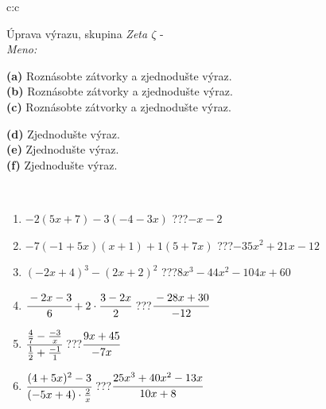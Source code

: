 \documentclass[10pt]{report}
\begin{document}
\newpage
\thispagestyle{empty}
\begin{tabular}{c:c}
\begin{minipage}[c][104.5mm][t]{0.5\linewidth}
\begin{center}
\vspace{7mm}
{\huge Úprava výrazu, skupina \textit{Zeta $\zeta$} -}\\[5mm]
\textit{Meno:}\phantom{xxxxxxxxxxxxxxxxxxxxxxxxxxxxxxxxxxxxxxxxxxxxxxxxxxxxxxxxxxxxxxxxx}\\[5mm]
\begin{minipage}{0.95\linewidth}
\begin{center}
{\small \begin{minipage}{0.6\textwidth}
\textbf{(a)} Roznásobte zátvorky a zjednodušte výraz. \\[1mm]
\textbf{(b)} Roznásobte zátvorky a zjednodušte výraz. \\[1mm]
\textbf{(c)} Roznásobte zátvorky a zjednodušte výraz.
\end{minipage} \begin{minipage}{0.39\textwidth}
\textbf{(d)} Zjednodušte výraz. \\[1mm]
\textbf{(e)} Zjednodušte výraz. \\[1mm]
\textbf{(f)} Zjednodušte výraz.
\end{minipage}
}
\end{center}
\end{minipage}
\\[4mm]
\begin{minipage}{0.79\linewidth}
\begin{center}
\begin{varwidth}{\linewidth}
\begin{enumerate}
\normalsize
\item $-2(5x+7)-3(-4-3x)$\quad \dotfill\; ???\;\dotfill \quad $-x-2$
\item $-7(-1+5x)(x+1)+1(5+7x)$\quad \dotfill\; ???\;\dotfill \quad $-35x^2+21x-12$
\item $(-2x+4)^3-(2x+2)^2$\quad \dotfill\; ???\;\dotfill \quad $8x^3-44x^2-104x+60$
\item $\cfrac{-2x-3}{6}+2\cdot\cfrac{3-2x}{2}$\quad \dotfill\; ???\;\dotfill \quad $\cfrac{-28x+30}{-12}$
\item $\cfrac{\frac{4}{7}-\frac{-3}{x}}{\frac{1}{2}+\frac{-1}{1}}$\quad \dotfill\; ???\;\dotfill \quad $\cfrac{9x+45}{-7x}$
\item $\cfrac{(4+5x)^2-3}{(-5x+4)\cdot\frac{2}{x}}$\quad \dotfill\; ???\;\dotfill \quad $\cfrac{25x^3+40x^2-13x}{10x+8}$

\end{enumerate}
\end{varwidth}
\end{center}
\end{minipage}
\end{center}
\end{minipage}
\end{tabular}
\end{document}
